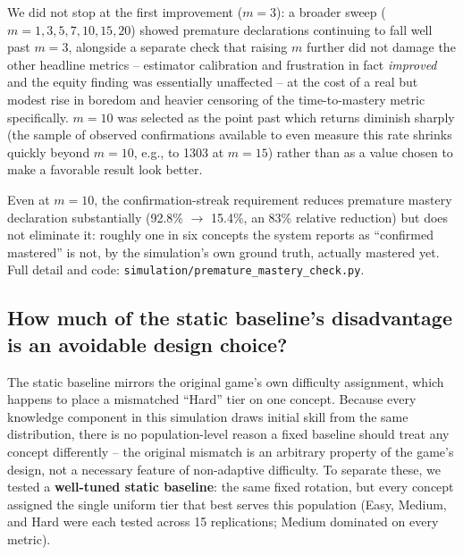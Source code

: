 \documentclass[11pt]{article}
\begin{document}
We did not stop at the first improvement ($m{=}3$): a broader sweep ($m{=}1,3,5,7,10,15,20$) showed premature declarations continuing to fall well past $m{=}3$, alongside a separate check that raising $m$ further did not damage the other headline metrics -- estimator calibration and frustration in fact \textit{improved} and the equity finding was essentially unaffected -- at the cost of a real but modest rise in boredom and heavier censoring of the time-to-mastery metric specifically. $m{=}10$ was selected as the point past which returns diminish sharply (the sample of observed confirmations available to even measure this rate shrinks quickly beyond $m{=}10$, e.g., to 1303 at $m{=}15$) rather than as a value chosen to make a favorable result look better.

Even at $m{=}10$, the confirmation-streak requirement reduces premature mastery declaration substantially (92.8\% $\to$ 15.4\%, an 83\% relative reduction) but does not eliminate it: roughly one in six concepts the system reports as ``confirmed mastered'' is not, by the simulation's own ground truth, actually mastered yet. Full detail and code: \texttt{simulation/premature\_mastery\_check.py}.

\subsection{How much of the static baseline's disadvantage is an avoidable design choice?}

The static baseline mirrors the original game's own difficulty assignment, which happens to place a mismatched ``Hard'' tier on one concept. Because every knowledge component in this simulation draws initial skill from the same distribution, there is no population-level reason a fixed baseline should treat any concept differently -- the original mismatch is an arbitrary property of the game's design, not a necessary feature of non-adaptive difficulty. To separate these, we tested a \textbf{well-tuned static baseline}: the same fixed rotation, but every concept assigned the single uniform tier that best serves this population (Easy, Medium, and Hard were each tested across 15 replications; Medium dominated on every metric).
\end{document}

